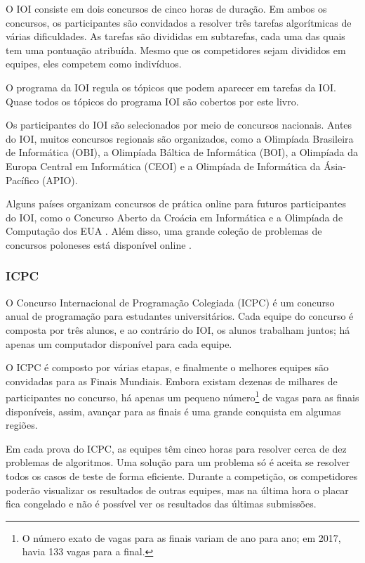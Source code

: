 O IOI consiste em dois concursos de cinco horas de duração.
Em ambos os concursos, os participantes são convidados a
resolver três tarefas algorítmicas de várias dificuldades.
As tarefas são divididas em subtarefas,
cada uma das quais tem uma pontuação atribuída.
Mesmo que os competidores sejam divididos em equipes,
eles competem como indivíduos.

O programa da IOI \cite{iois} regula os tópicos
que podem aparecer em tarefas da IOI.
Quase todos os tópicos do programa IOI são cobertos por este livro.

Os participantes do IOI são selecionados por meio de
concursos nacionais.
Antes do IOI, muitos concursos regionais são organizados,
como a Olimpíada Brasileira de Informática (OBI),
a Olimpíada Báltica de Informática (BOI),
a Olimpíada da Europa Central em Informática (CEOI)
e a Olimpíada de Informática da Ásia-Pacífico (APIO).

Alguns países organizam concursos de prática online
para futuros participantes do IOI,
como o Concurso Aberto da Croácia em Informática \cite{coci}
e a Olimpíada de Computação dos EUA \cite{usaco}.
Além disso, uma grande coleção de problemas de concursos poloneses
está disponível online \cite{main}.

\subsubsection{ICPC}

O Concurso Internacional de Programação Colegiada (ICPC)
é um concurso anual de programação para estudantes universitários.
Cada equipe do concurso é composta por três alunos,
e ao contrário do IOI, os alunos trabalham juntos;
há apenas um computador disponível para cada equipe.

O ICPC é composto por várias etapas, e finalmente o
melhores equipes são convidadas para as Finais Mundiais.
Embora existam dezenas de milhares de participantes
no concurso, há apenas um pequeno número\footnote{O número exato de vagas para as finais
variam de ano para ano; em 2017, havia 133 vagas para a final.} de vagas para as finais disponíveis,
assim, avançar para as finais é uma grande conquista em algumas regiões.

Em cada prova do ICPC, as equipes têm cinco horas para
resolver cerca de dez problemas de algoritmos.
Uma solução para um problema só é aceita se resolver
todos os casos de teste de forma eficiente.
Durante a competição, os competidores poderão visualizar os resultados de outras equipes,
mas na última hora o placar fica congelado e
não é possível ver os resultados das últimas submissões.

